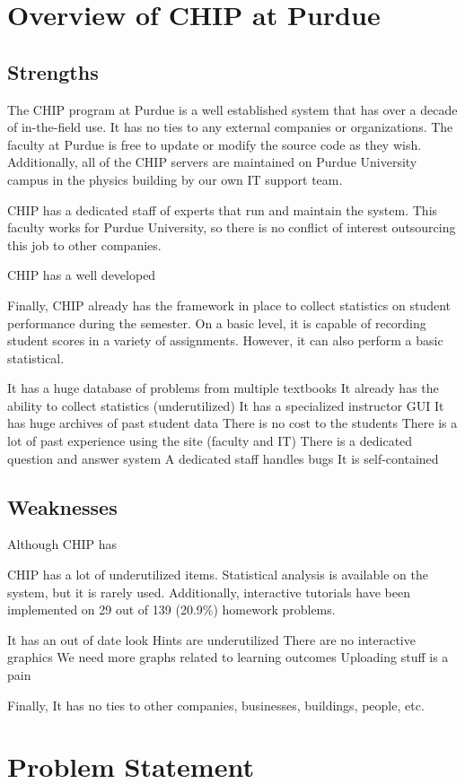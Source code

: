 \section{Overview of CHIP at Purdue}

\subsection{Strengths}

The CHIP program at Purdue is a well established system that has over a decade of in-the-field use. It has no ties to any external companies or organizations. The faculty at Purdue is free to update or modify the source code as they wish. Additionally, all of the CHIP servers are maintained on Purdue University campus in the physics building by our own IT support team.

CHIP has a dedicated staff of experts that run and maintain the system. This faculty works for Purdue University, so there is no conflict of interest outsourcing this job to other companies.

CHIP has a well developed

Finally, CHIP already has the framework in place to collect statistics on student performance during the semester. On a basic level, it is capable of recording student scores in a variety of assignments. However, it can also perform a basic statistical.

It has a huge database of problems from multiple textbooks
It already has the ability to collect statistics (underutilized)
It has a specialized instructor GUI
It has huge archives of past student data
There is no cost to the students
There is a lot of past experience using the site (faculty and IT)
There is a dedicated question and answer system
A dedicated staff handles bugs
It is self-contained

\subsection{Weaknesses}

Although CHIP has

CHIP has a lot of underutilized items. Statistical analysis is available on the system, but it is rarely used. Additionally, interactive tutorials have been implemented on 29 out of 139 (20.9\%) homework problems.

It has an out of date look
Hints are underutilized
There are no interactive graphics
We need more graphs related to learning outcomes
Uploading stuff is a pain

Finally, It has no ties to other companies, businesses, buildings, people, etc.

\section{Problem Statement}

